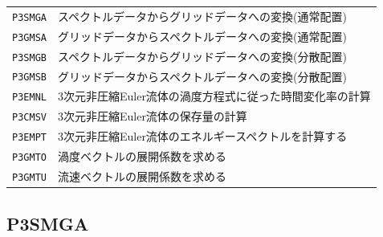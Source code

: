 \documentclass[a4j,fleqn]{jarticle}
\begin{document}
\vspace{1em}
\begin{tabular}{ll}
{\tt P3SMGA} & スペクトルデータからグリッドデータへの変換(通常配置)\\
{\tt P3GMSA} & グリッドデータからスペクトルデータへの変換(通常配置)\\
{\tt P3SMGB} & スペクトルデータからグリッドデータへの変換(分散配置)\\
{\tt P3GMSB} & グリッドデータからスペクトルデータへの変換(分散配置)\\
{\tt P3EMNL} & 3次元非圧縮Euler流体の渦度方程式に従った時間変化率の計算\\
{\tt P3CMSV} & 3次元非圧縮Euler流体の保存量の計算\\
{\tt P3EMPT} & 3次元非圧縮Euler流体のエネルギースペクトルを計算する\\
{\tt P3GMTO} & 渦度ベクトルの展開係数を求める\\
{\tt P3GMTU} & 流速ベクトルの展開係数を求める
\end{tabular}


\subsection{P3SMGA}
\end{document}

